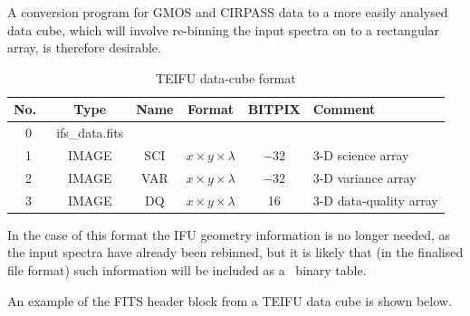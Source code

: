 \documentclass[twoside,11pt]{article}
\newcommand{\htmlref}[2]{#1}
\begin{document}
A \htmlref{conversion program}{sc16_mef2cub} for GMOS and CIRPASS data
to a more easily analysed data cube, which will involve re-binning the
input spectra on to a rectangular array, is therefore
desirable.

\begin{table}[h]
\begin{center}
\begin{tabular}{cccccl}
No.\ & Type  & Name & Format & BITPIX & Comment\\\hline 
0 &ifs\_data.fits &  &          &       & \\
1 & IMAGE & SCI & $x \times y\times \lambda$ & $-$32 & 3-D science array \\
2 & IMAGE & VAR & $x \times y\times \lambda$ & $-$32 & 3-D variance array \\
3 & IMAGE & DQ  & $x \times y\times \lambda$ &    16 & 3-D data-quality array \\ \hline
\end{tabular}
\caption{TEIFU data-cube format}
\end{center}
\protect\label{tab:cub_file}
\end{table} 

In the case of this format the IFU geometry information is no longer
needed, as the input spectra have already been rebinned, but it is
likely that (in the finalised file format) such information will be
included as a \FITSref\  binary table.

An example of the FITS header block from a TEIFU data cube is shown below.
\end{document}
